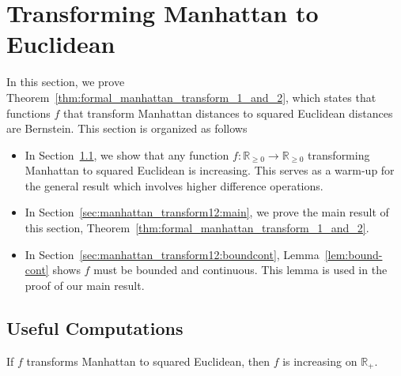 
\section{Transforming Manhattan to Euclidean}\label{sec:manhattan_transform12}



In this section, we prove Theorem~\ref{thm:formal_manhattan_transform_1_and_2}, which states that
functions $f$ that transform Manhattan distances to squared Euclidean
distances are Bernstein.  This section is organized as follows

\begin{itemize}
   \item In Section~\ref{sec:manhattan_transform12:converse},  we show that any function $f:\mathbb R_{\geq 0}\to\mathbb R_{\geq 0}$ transforming
Manhattan to squared Euclidean is increasing. This serves as a warm-up for the general result which involves higher difference operations.
    \item In Section~\ref{sec:manhattan_transform12:main}, we prove the main result of this section, Theorem~\ref{thm:formal_manhattan_transform_1_and_2}.
    \item In Section~\ref{sec:manhattan_transform12:boundcont}, Lemma~\ref{lem:bound-cont} shows $f$ must be bounded and
continuous. This lemma is used in the proof of our main result.
\end{itemize}

\subsection{Useful Computations}\label{sec:manhattan_transform12:converse}

\begin{lemma}\label{lem:1deriv} 
If $f$ transforms Manhattan to squared Euclidean, then $f$ is increasing on $\mathbb R_+$. 
\end{lemma}

